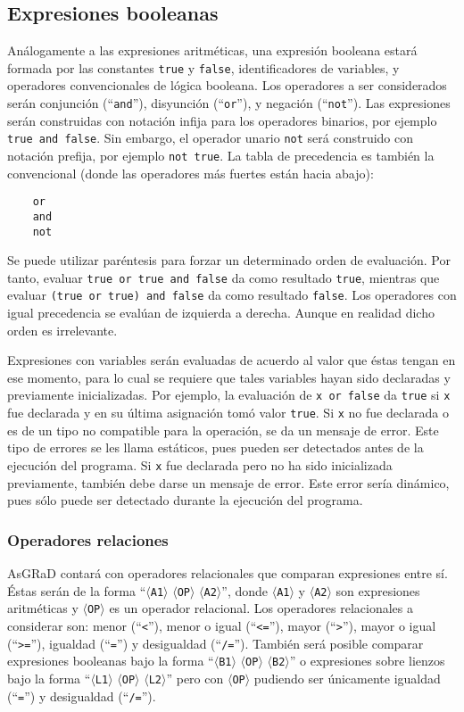 \documentclass[letterpaper,11pt]{article}
\newcommand{\asgrad}{AsGRaD\xspace}
\newcommand{\general}[1]{$\langle$\texttt{#1}$\rangle$}
\newcommand{\qt}[1]{``\texttt{#1}''}
\begin{document}
\subsection{Expresiones booleanas}

Análogamente a las expresiones aritméticas, una expresión booleana estará formada por las constantes \texttt{true} y \texttt{false}, identificadores de variables, y operadores convencionales de lógica booleana. Los operadores a ser considerados serán conjunción (\qt{and}), disyunción (\qt{or}), y negación (\qt{not}). Las expresiones serán construidas con notación infija para los operadores binarios, por ejemplo \texttt{true and false}. Sin embargo, el operador unario \texttt{not} será construido con notación prefija, por ejemplo \texttt{not true}. La tabla de precedencia es también la convencional (donde las operadores más fuertes están hacia abajo):

\begin{lstlisting}
    or
    and
    not    
\end{lstlisting}

Se puede utilizar paréntesis para forzar un determinado orden de evaluación. Por tanto, evaluar \texttt{true or true and false} da como resultado \texttt{true}, mientras que evaluar \texttt{(true or true) and false} da como resultado \texttt{false}. Los operadores con igual precedencia se evalúan de izquierda a derecha. Aunque en realidad dicho orden es irrelevante.

Expresiones con variables serán evaluadas de acuerdo al valor que éstas tengan en ese momento, para lo cual se requiere que tales variables hayan sido declaradas y previamente inicializadas. Por ejemplo, la evaluación de \texttt{x or false} da \texttt{true} si \texttt{x} fue declarada y en su última asignación tomó valor \texttt{true}. Si \texttt{x} no fue declarada o es de un tipo no compatible para la operación, se da un mensaje de error. Este tipo de errores se les llama estáticos, pues pueden ser detectados antes de la ejecución del programa. Si \texttt{x} fue declarada pero no ha sido inicializada previamente, también debe darse un mensaje de error. Este error sería dinámico, pues sólo puede ser detectado durante la ejecución del programa.

\subsubsection{Operadores relaciones}

\asgrad contará con operadores relacionales que comparan expresiones entre sí. Éstas serán de la forma ``\general{A1} \general{OP} \general{A2}'', donde \general{A1} y \general{A2} son expresiones aritméticas y \general{OP} es un operador relacional. Los operadores relacionales a considerar son: menor (\qt{<}), menor o igual (\qt{<=}), mayor (\qt{>}), mayor o igual (\qt{>=}), igualdad (\qt{=}) y desigualdad (\qt{/=}). También será posible comparar expresiones booleanas bajo la forma ``\general{B1} \general{OP} \general{B2}'' o expresiones sobre lienzos bajo la forma ``\general{L1} \general{OP} \general{L2}'' pero con \general{OP} pudiendo ser únicamente igualdad (\qt{=}) y desigualdad (\qt{/=}).
\end{document}
